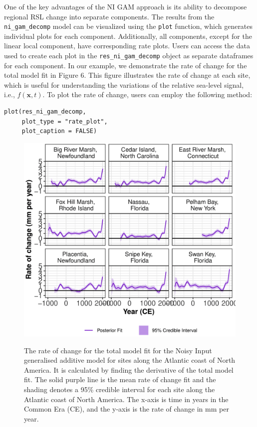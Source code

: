 One of the key advantages of the NI GAM approach is its ability to decompose regional RSL change into separate components. The results from the \texttt{ni\_gam\_decomp} model can be visualized using the \texttt{plot} function, which generates individual plots for each component. Additionally, all components, except for the linear local component, have corresponding rate plots. Users can access the data used to create each plot in the \texttt{res\_ni\_gam\_decomp} object as separate dataframes for each component.
In our example, we demonstrate the rate of change for the total model fit in Figure 6. This figure illustrates the rate of change at each site, which is useful for understanding the variations of the relative sea-level signal, i.e., \(f(\mathbf{x},t)\). To plot the rate of change, users can employ the following method:
\scriptsize
\begin{verbatim}
plot(res_ni_gam_decomp, 
     plot_type = "rate_plot",
     plot_caption = FALSE)
\end{verbatim}
\begin{figure}
{\centering \includegraphics[width=0.8\linewidth]{figures/niplotrate-1} 
}
\caption{The rate of change for the total model fit for the Noisy Input generalised additive model for sites along the Atlantic coast of North America. It is calculated by finding the derivative of the total model fit. The solid purple line is the mean rate of change fit and the shading denotes a 95\% credible interval for each site along the Atlantic coast of North America. The x-axis is time in years in the Common Era (CE), and the y-axis is the rate of change in mm per year.}\label{fig:niplotrateload}
\end{figure}
